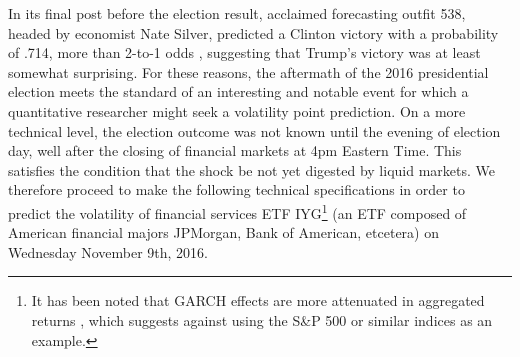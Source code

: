 \documentclass[11pt]{article}
\theoremstyle{definition}
\begin{document}
In its final post before the election result, acclaimed forecasting outfit 538, headed by economist Nate Silver, predicted a Clinton victory with a probability of .714, more than 2-to-1 odds \citep{Silver_2016}, suggesting that Trump's victory was at least somewhat surprising.  For these reasons, the aftermath of the 2016 presidential election meets the standard of an interesting and notable event for which a quantitative researcher might seek a volatility point prediction.  On a more technical level, the election outcome was not known until the evening of election day, well after the closing of financial markets at 4pm Eastern Time.  This satisfies the condition that the shock be not yet digested by liquid markets.  We therefore proceed to make the following technical specifications in order to predict the volatility of financial services ETF IYG\footnote{It has been noted that GARCH effects are more attenuated in aggregated returns \citep{zivot2009practical}, which suggests against using the S\&P 500 or similar indices as an example.} (an ETF composed of American financial majors JPMorgan, Bank of American, etcetera) on Wednesday November 9th, 2016.
\end{document}
